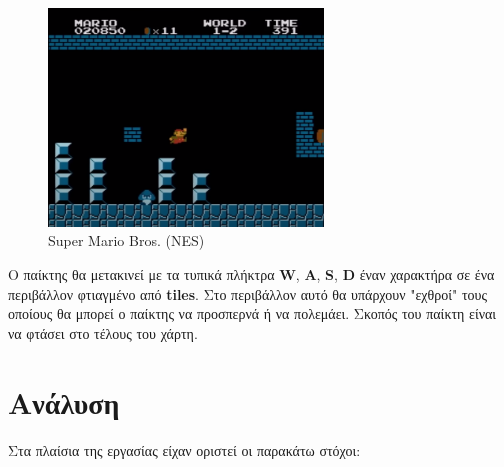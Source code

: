 \documentclass[12pt]{article}
\begin{document}
 	\begin{figure}[H]
	\centering
	\includegraphics[width=0.65\textwidth]{mario.png}
	\caption{Super Mario Bros. (NES)}
	\label{fig:mario}
	\end{figure}
	
	Ο παίκτης θα μετακινεί με τα τυπικά πλήκτρα \textbf{W}, \textbf{A}, \textbf{S}, \textbf{D} έναν χαρακτήρα σε ένα περιβάλλον φτιαγμένο από \textbf{tiles}. Στο περιβάλλον αυτό θα υπάρχουν "εχθροί" τους οποίους θα μπορεί ο παίκτης να προσπερνά ή να πολεμάει. Σκοπός του παίκτη είναι να φτάσει στο τέλους του χάρτη.

	
	\section{Ανάλυση}
	
	
	Στα πλαίσια της εργασίας είχαν οριστεί οι παρακάτω στόχοι:
	
\end{document}

